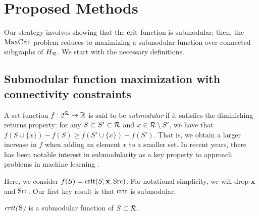 
\section{Proposed Methods}
\label{sec:proposed-critical}
Our strategy involves showing that the $\text{crit}$ function is submodular; then, the $\text{MaxCrit}{}$ problem reduces to maximizing a submodular function over connected subgraphs of $H_{\mathcal{R}}$. We start with the necessary definitions.

\subsection{Submodular function maximization with connectivity constraints}
\label{sec:submod-connectivity}
A set function $f: 2^{\mathcal{R}} \rightarrow \mathbb{R}$ is said to be \emph{submodular} if it satisfies the diminishing returns property: for any $S \subset S'\subset \mathcal{R}$ and $x \in \mathcal{R}\setminus S'$, we have that $f(S \cup \{x\}) - f(S) \geq f(S' \cup \{x\}) - f(S')$. That is, we obtain a larger increase in $f$ when adding an element $x$ to a smaller set. In recent years, there has been notable interest in submodularity as a key property to approach problems in machine learning \cite{krause2008beyond}. 

Here, we consider $f(S)=\text{crit}(S, \mathbf{x}, \text{Src})$. For notational simplicity, we will drop $\mathbf{x}$ and $\text{Src}$. Our first key result is that $\text{crit}$ is submodular. %

\begin{lemma}
$\text{\emph{\text{crit}(}S\text{\emph{)}}}$ is a submodular function of $S\subset\mathcal{R}$.
\end{lemma}

